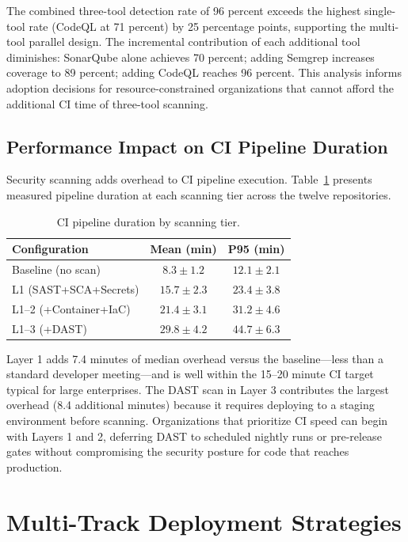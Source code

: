 \documentclass{ieeeaccess}
\begin{document}
The combined three-tool detection rate of 96 percent exceeds the highest single-tool rate (CodeQL at 71 percent) by 25 percentage points, supporting the multi-tool parallel design. The incremental contribution of each additional tool diminishes: SonarQube alone achieves 70 percent; adding Semgrep increases coverage to 89 percent; adding CodeQL reaches 96 percent. This analysis informs adoption decisions for resource-constrained organizations that cannot afford the additional CI time of three-tool scanning.

\subsection{Performance Impact on CI Pipeline Duration}
Security scanning adds overhead to CI pipeline execution. Table~\ref{tab:duration} presents measured pipeline duration at each scanning tier across the twelve repositories.

\begin{table}[!t]
\caption{CI pipeline duration by scanning tier.}
\label{tab:duration}
\centering
\begin{tabular}{lcc}
\hline
\textbf{Configuration} & \textbf{Mean (min)} & \textbf{P95 (min)} \\
\hline
Baseline (no scan)            & $8.3 \pm 1.2$  & $12.1 \pm 2.1$ \\
L1 (SAST+SCA+Secrets)         & $15.7 \pm 2.3$ & $23.4 \pm 3.8$ \\
L1--2 (+Container+IaC)        & $21.4 \pm 3.1$ & $31.2 \pm 4.6$ \\
L1--3 (+DAST)                 & $29.8 \pm 4.2$ & $44.7 \pm 6.3$ \\
\hline
\end{tabular}
\end{table}

Layer 1 adds 7.4 minutes of median overhead versus the baseline---less than a standard developer meeting---and is well within the 15--20 minute CI target typical for large enterprises. The DAST scan in Layer 3 contributes the largest overhead (8.4 additional minutes) because it requires deploying to a staging environment before scanning. Organizations that prioritize CI speed can begin with Layers 1 and 2, deferring DAST to scheduled nightly runs or pre-release gates without compromising the security posture for code that reaches production.

\section{Multi-Track Deployment Strategies}
\label{sec:multitrack}
\end{document}
